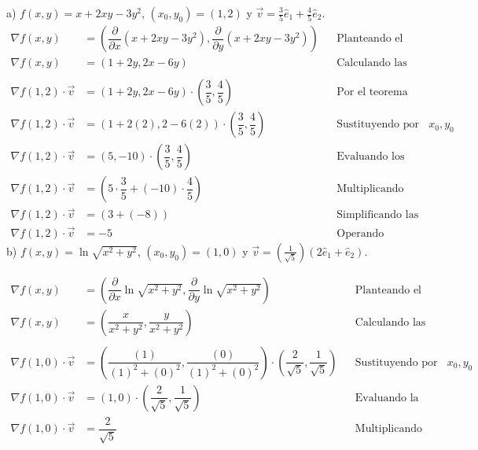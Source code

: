 \documentclass[letterpaper]{article}
\renewcommand{\d}{\partial}
\renewcommand{\*}{\cdot}
\theoremstyle{definition}
\begin{document}
a) $f(x,y) = x + 2xy -3y^2$, $(x_0, y_0) = (1,2)$ y $\vec{v} = \frac{3}{5}\hat{e}_1 + \frac{4}{5}\hat{e}_2 $.\\

\begin{align*}
	\nabla f(x,y) &= \left( \dfrac{\d}{\d x}  (x + 2xy -3y^2), \dfrac{\d}{\d y} (x + 2xy -3y^2) \right) && \text{Planteando el gradiente}\\
	\nabla f(x,y) &= \left( 1 + 2y , 2x -6y \right) && \text{Calculando las parciales }\\
	\\	
	\nabla f(1,2) \* \vec{v} &= \left( 1 + 2y , 2x -6y \right) \* \left(\dfrac{3}{5}, \dfrac{4}{5}\right) && \text{Por el teorema enunciado al inicio del ejercicio}\\
	\nabla f(1,2) \* \vec{v} &= \left( 1 + 2(2) , 2 -6(2) \right) \* \left(\dfrac{3}{5}, \dfrac{4}{5}\right) && \text{Sustituyendo por los valores de }x_0, y_0 \\
	\nabla f(1,2) \* \vec{v} &= \left( 5 ,-10 \right) \* \left(\dfrac{3}{5}, \dfrac{4}{5}\right) && \text{Evaluando los puntos}\\
	\nabla f(1,2) \* \vec{v} &= \left( 5\* \dfrac{3}{5} + (-10)\*\dfrac{4}{5} \right) && \text{Multiplicando entrada a entrada  }\\
	\nabla f(1,2) \* \vec{v} &= \left(3 + (-8)\right) && \text{Simplificando las fracciones  }\\
	\nabla f(1,2) \* \vec{v} &=-5 && \text{Operando}
\end{align*}
\newpage
b) $f(x,y) = \ln{\sqrt{x^2 + y^2}}$, $(x_0, y_0) = (1,0)$ y $\vec{v} = \left( \frac{1}{\sqrt{5}} \right)(2\hat{e}_1 + \hat{e}_2 )$.

\begin{align*}
	\nabla f(x,y) &= \left( \dfrac{\d}{\d x} \ln{\sqrt{x^2 + y^2}}, \dfrac{\d}{\d y}\ln{\sqrt{x^2 + y^2}} \right) && \text{Planteando el gradiente}\\
	\nabla f(x,y) &= \left( \dfrac{x}{x^2 + y^2}, \dfrac{y}{x^2 + y^2} \right) && \text{Calculando las derivadas parciales}\\
	\\	
	\nabla f(1,0) \* \vec{v} &= \left( \dfrac{(1)}{(1)^2 + (0)^2}, \dfrac{(0)}{(1)^2 + (0)^2}  \right) \* \left(\dfrac{2}{\sqrt{5}}, \dfrac{1}{\sqrt{5}} \right) && \text{Sustituyendo por los valores de } x_0, y_0\\
	\nabla f(1,0) \* \vec{v} &= \left(1,0\right) \* \left(\dfrac{2}{\sqrt{5}}, \dfrac{1}{\sqrt{5}} \right) && \text{Evaluando la expresión }\\
	\nabla f(1,0) \* \vec{v} &= \dfrac{2}{\sqrt{5}}&& \text{Multiplicando }\\
\end{align*}
\end{document}
